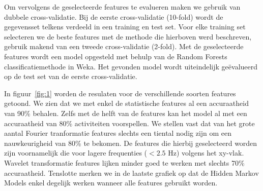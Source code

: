 \documentclass{article}
\begin{document}
Om vervolgens de geselecteerde features te evalueren maken we gebruik van dubbele cross-validatie. Bij de eerste cross-validatie (10-fold) wordt de gegevensset telkens verdeeld in een training en test set. Voor elke training set selecteren we de beste features met de methode die hierboven werd beschreven, gebruik makend van een tweede cross-validatie (2-fold). Met de geselecteerde features wordt een model opgesteld met behulp van de Random Forests classificatiemethode in Weka. Het gevonden model wordt uiteindelijk ge\"evalueerd op de test set van de eerste cross-validatie.
	
In figuur~\ref{fig:1} worden de resulaten voor de verschillende soorten features getoond. We zien dat we met enkel de statistische features al een accuraatheid van 90\% behalen. Zelfs met de helft van de features kan het model al met een accuraatheid van 80\% activiteiten voorspellen. We stellen vast dat van het grote aantal Fourier tranformatie features slechts een tiental nodig zijn om een nauwkeurigheid van 80\% te bekomen. De features die hierbij geselecteerd worden zijn voornamelijk die voor lagere frequenties ($<2.5$ Hz) volgens het xy-vlak. Wavelet transformatie features lijken minder goed te werken met slechts 70\% accuraatheid. Tenslotte merken we in de laatste grafiek op dat de Hidden Markov Models enkel degelijk werken wanneer alle features gebruikt worden.
\end{document}
